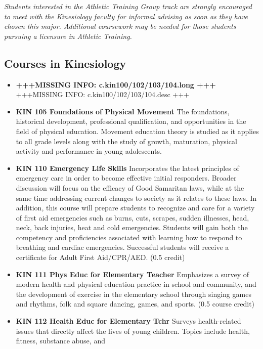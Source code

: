 \documentclass[
  letterpaper,
]{scrbook}
\providecommand{\tightlist}{%
  \setlength{\itemsep}{0pt}\setlength{\parskip}{0pt}}
\begin{document}
\emph{Students interested in the Athletic Training Group track are
strongly encouraged to meet with the Kinesiology faculty for informal
advising as soon as they have chosen this major. Additional coursework
may be needed for those students pursuing a licensure in Athletic
Training. }

\hypertarget{courses-in-kinesiology}{%
\subsection{Courses in Kinesiology}\label{courses-in-kinesiology}}

\begin{itemize}
\tightlist
\item
  \textbf{+++MISSING INFO: c.kin100/102/103/104.long +++} +++MISSING
  INFO: c.kin100/102/103/104.desc +++
\item
  \textbf{KIN 105 Foundations of Physical Movement} The foundations,
  historical development, professional qualification, and opportunities
  in the field of physical education. Movement education theory is
  studied as it applies to all grade levels along with the study of
  growth, maturation, physical activity and performance in young
  adolescents.
\item
  \textbf{KIN 110 Emergency Life Skills} Incorporates the latest
  principles of emergency care in order to become effective initial
  responders. Broader discussion will focus on the efficacy of Good
  Samaritan laws, while at the same time addressing current changes to
  society as it relates to these laws. In addition, this course will
  prepare students to recognize and care for a variety of first aid
  emergencies such as burns, cuts, scrapes, sudden illnesses, head,
  neck, back injuries, heat and cold emergencies. Students will gain
  both the competency and proficiencies associated with learning how to
  respond to breathing and cardiac emergencies. Successful students will
  receive a certificate for Adult First Aid/CPR/AED. (0.5 credit)
\item
  \textbf{KIN 111 Phys Educ for Elementary Teacher} Emphasizes a survey
  of modern health and physical education practice in school and
  community, and the development of exercise in the elementary school
  through singing games and rhythms, folk and square dancing, games, and
  sports. (0.5 course credit)
\item
  \textbf{KIN 112 Health Educ for Elementary Tchr} Surveys
  health-related issues that directly affect the lives of young
  children. Topics include health, fitness, substance abuse, and

\end{itemize}
\end{document}
